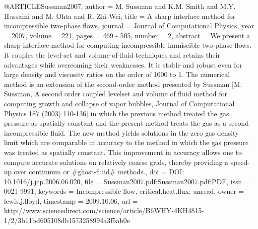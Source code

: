 {{@ARTICLE{Sussman2007,
  author = {M. Sussman and K.M. Smith and M.Y. Hussaini and M. Ohta and R. Zhi-Wei},
  title = {A sharp interface method for incompressible two-phase flows},
  journal = {Journal of Computational Physics},
  year = {2007},
  volume = {221},
  pages = {469 - 505},
  number = {2},
  abstract = {We present a sharp interface method for computing incompressible immiscible
	two-phase flows. It couples the level-set and volume-of-fluid techniques
	and retains their advantages while overcoming their weaknesses. It
	is stable and robust even for large density and viscosity ratios
	on the order of 1000 to 1. The numerical method is an extension of
	the second-order method presented by Sussman [M. Sussman, A second
	order coupled levelset and volume of fluid method for computing growth
	and collapse of vapor bubbles, Journal of Computational Physics 187
	(2003) 110-136] in which the previous method treated the gas pressure
	as spatially constant and the present method treats the gas as a
	second incompressible fluid. The new method yields solutions in the
	zero gas density limit which are comparable in accuracy to the method
	in which the gas pressure was treated as spatially constant. This
	improvement in accuracy allows one to compute accurate solutions
	on relatively coarse grids, thereby providing a speed-up over continuum
	or #ghost-fluid# methods.},
  doi = {DOI: 10.1016/j.jcp.2006.06.020},
  file = {Sussman2007.pdf:Sussman2007.pdf:PDF},
  issn = {0021-9991},
  keywords = {Incompressible flow, critical.heat.flux; unread},
  owner = {lewis.j.lloyd},
  timestamp = {2009.10.06},
  url = {http://www.sciencedirect.com/science/article/B6WHY-4KH4815-1/2/3b11bd605108db1573258994a3f5ab0e}
}

}}
